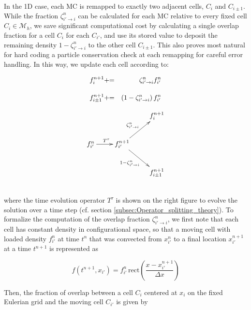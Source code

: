 \documentclass[11pt,titlepage]{report}
\begin{document}
In the 1D case, each MC is remapped to exactly two adjacent cells, $C_i$ and $C_{i\pm 1}$. While the fraction $\zeta^n_{i'\to i}$ can be calculated for each MC relative to every fixed cell $C_i\in\mathcal{M}_h$, we save significant computational cost by calculating a single overlap fraction for a cell $C_i$ for each $C_{i'}$, and use its stored value to deposit the remaining density $1 - \zeta^n_{i'\to i}$ to the other cell $C_{i\pm 1}$. This also proves most natural for hard coding a particle conservation check at each remapping for careful error handling. In this way, we update each cell according to:

\begin{minipage}{0.4\textwidth}
\begin{eqnarray*}
f_i^{n+1} &+\hspace{-.3em}=& \zeta^n_{i'\rightarrow i}f^{n}_{i'} \\[1em]
f_{i\pm 1}^{n+1}&+\hspace{-.3em}=& (1 - \zeta^n_{i'\rightarrow i})\, f_{i'}^{n}
\end{eqnarray*}
\end{minipage}
\begin{minipage}{0.4\textwidth}
$$
    \xymatrix{
       &  & f^{n+1}_i \\
       f^n_{i'} \ar[r]^{T^{\tau}} & f^{n+1}_{i'} \ar[ur]^{\zeta^n_{i'\rightarrow i}} \ar[dr]_{1 - \zeta^n_{i'\rightarrow i}}              & \\
           &                    & f^{n+1}_{i\pm 1} }
$$
\end{minipage}\\[0.3em]


\noindent where the time evolution operator $T^{\tau}$ is shown on the right figure to evolve the solution over a time step (cf. section \ref{subsec:Operator_splitting_theory}). To formalize the computation of the overlap fraction $\zeta^n_{i'\rightarrow i}$, we first note that each cell has constant density in configurational space, so that a moving cell with loaded density $f_{i'}^{n}$ at time $t^n$ that was convected from $x_{i'}^{n}$ to a final location $x_{i'}^{n+1}$ at a time $t^{n+1}$ is represented as

$$f(t^{n+1},x_{i'}) = f_{i'}^{n} \,\mathrm{rect}\left(\frac{x - x_{i'}^{n+1}}{\Delta x}\right)$$

\noindent Then, the fraction of overlap between a cell $C_i$ centered at $x_i$ on the fixed Eulerian grid and the moving cell $C_{i'}$ is given by
\end{document}
